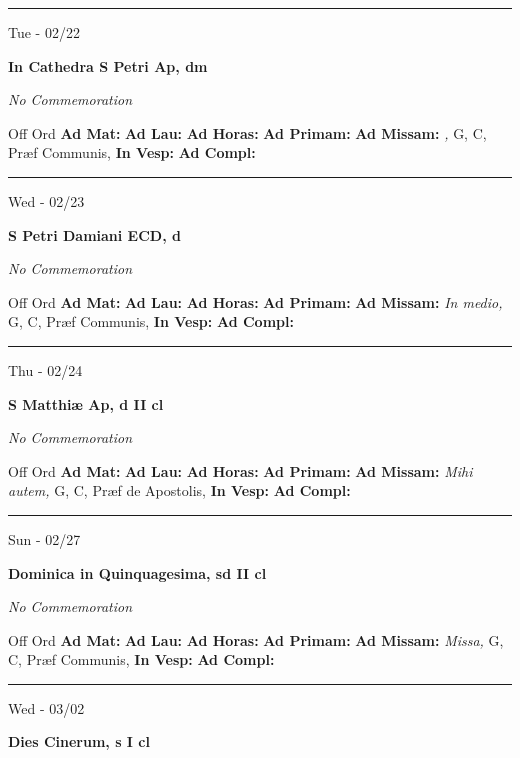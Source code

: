 \documentclass[letterpaper, 10pt]{article}
\begin{document}
\hrule
\begin{center}
Tue - 02/22
\end{center}\textbf{ \large In Cathedra S Petri Ap, \textnormal{\normalsize dm}}

\textit{No Commemoration}\begin{justify}
Off Ord
\textbf{Ad Mat: }
\textbf{Ad Lau: }
\textbf{Ad Horas: }
\textbf{Ad Primam: }
\textbf{Ad Missam:} \textit{, } G, C, Præf Communis, 
\textbf{In Vesp: }
\textbf{Ad Compl: }\end{justify}



\hrule
\begin{center}
Wed - 02/23
\end{center}\textbf{ \large S Petri Damiani ECD, \textnormal{\normalsize d}}

\textit{No Commemoration}\begin{justify}
Off Ord
\textbf{Ad Mat: }
\textbf{Ad Lau: }
\textbf{Ad Horas: }
\textbf{Ad Primam: }
\textbf{Ad Missam:} \textit{In medio, } G, C, Præf Communis, 
\textbf{In Vesp: }
\textbf{Ad Compl: }\end{justify}



\hrule
\begin{center}
Thu - 02/24
\end{center}\textbf{ \large S Matthiæ Ap, \textnormal{\normalsize d II cl}}

\textit{No Commemoration}\begin{justify}
Off Ord
\textbf{Ad Mat: }
\textbf{Ad Lau: }
\textbf{Ad Horas: }
\textbf{Ad Primam: }
\textbf{Ad Missam:} \textit{Mihi autem, } G, C, Præf de Apostolis, 
\textbf{In Vesp: }
\textbf{Ad Compl: }\end{justify}



\hrule
\begin{center}
Sun - 02/27
\end{center}\textbf{ \large Dominica in Quinquagesima, \textnormal{\normalsize sd II cl}}

\textit{No Commemoration}\begin{justify}
Off Ord
\textbf{Ad Mat: }
\textbf{Ad Lau: }
\textbf{Ad Horas: }
\textbf{Ad Primam: }
\textbf{Ad Missam:} \textit{Missa, } G, C, Præf Communis, 
\textbf{In Vesp: }
\textbf{Ad Compl: }\end{justify}



\hrule
\begin{center}
Wed - 03/02
\end{center}\textbf{ \large Dies Cinerum, \textnormal{\normalsize s I cl}}
\end{document}
